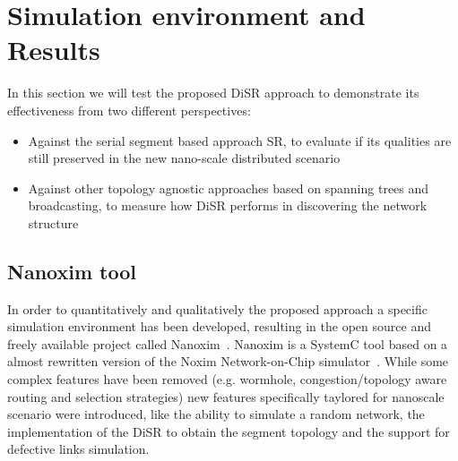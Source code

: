 \documentclass[final,journal,letterpaper]{IEEEtran}
\begin{document}
\section{Simulation environment and Results}

In this section we will test the proposed DiSR approach to demonstrate
its effectiveness from two different perspectives:
\begin{itemize}
\item Against the serial segment based approach SR, to evaluate if 
its qualities are still preserved in the new nano-scale distributed scenario
\item Against other topology agnostic approaches based on spanning
trees and broadcasting, to measure how DiSR performs in discovering
the network structure 
\end{itemize}

\subsection{Nanoxim tool}

In order to quantitatively and qualitatively the proposed approach a
specific simulation environment has been developed, resulting in
the open source and freely available project called Nanoxim~\cite{}.
Nanoxim is a SystemC tool based on a almost rewritten
version of the Noxim Network-on-Chip simulator~\cite{}. While some
complex features have been removed (e.g. wormhole, congestion/topology
aware routing and selection strategies) new features specifically
taylored for nanoscale scenario were introduced, like the ability to simulate a random
network, the implementation of the DiSR to obtain the segment topology
and the support for defective links simulation.

\end{document}
